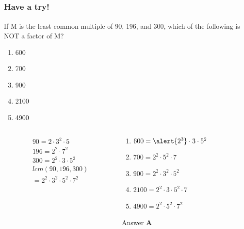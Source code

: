 \documentclass[
	11pt, %
]{beamer}
\begin{document}
\begin{frame}
	\frametitle{Have a try!}
	\framesubtitle{}
		If M is the least common multiple of 90, 196, and 300, which of the following is NOT a factor of M?
		 \begin{enumerate}[A]
		 	\item 600
		 	\item 700
		 	\item  900
		 	\item 2100
		 	\item 4900
		 	\end{enumerate}

		 	\pause 


	\begin{columns}[t] %
		\begin{column}{0.45\textwidth} %
						\begin{equation*}
					\begin{split}
					&90 = 2 \cdot 3^2 \cdot 5 \\
			 		&196 = 2^2 \cdot 7^2 \\
			 		&300 =  2^2 \cdot 3 \cdot 5^2 \\
			 		&lcm(90, 196, 300) \\ &= 2^2 \cdot 3^2 \cdot 5^2\cdot 7^2   
					\end{split}
				\end{equation*}

		\end{column}
		\begin{column}{0.5\textwidth} %
						\begin{enumerate}[A]
		 	\item $600 = \alert{2^3} \cdot 3 \cdot 5^2$
		 	\item $700 = 2^2 \cdot 5^2 \cdot 7 $
		 	\item  $900 = 2^2 \cdot 3^2 \cdot 5^2$
		 	\item $2100 = 2^2 \cdot 3 \cdot  5^2  \cdot 7$
		 	\item $4900 = 2^2 \cdot 5^2 \cdot 7^2$
		 	\end{enumerate} 
		 	Answer \textbf{A}
		\end{column}
	\end{columns}
\end{frame}


\end{document}
